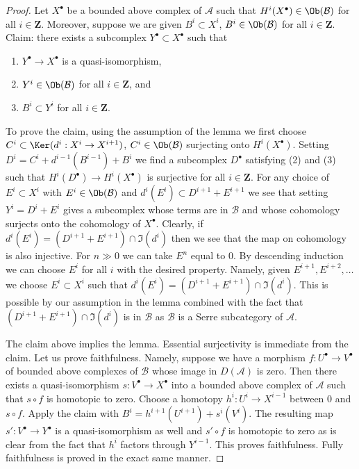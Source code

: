 \begin{proof}
Let $X^\bullet$ be a bounded above complex of $\mathcal{A}$ such that
$H^i(X^\bullet) \in \Ob(\mathcal{B})$ for all $i \in \mathbf{Z}$.
Moreover, suppose we are given $B^i \subset X^i$, $B^i \in \Ob(\mathcal{B})$
for all $i \in \mathbf{Z}$. Claim: there exists a subcomplex
$Y^\bullet \subset X^\bullet$ such that
\begin{enumerate}
\item $Y^\bullet \to X^\bullet$ is a quasi-isomorphism,
\item $Y^i \in \Ob(\mathcal{B})$ for all $i \in \mathbf{Z}$, and
\item $B^i \subset Y^i$ for all $i \in \mathbf{Z}$.
\end{enumerate}
To prove the claim, using the assumption of the lemma we first choose
$C^i \subset \Ker(d^i : X^i \to X^{i + 1})$, $C^i \in \Ob(\mathcal{B})$
surjecting onto $H^i(X^\bullet)$. Setting
$D^i = C^i + d^{i - 1}(B^{i - 1}) + B^i$ we find a subcomplex
$D^\bullet$ satisfying (2) and (3) such that
$H^i(D^\bullet) \to H^i(X^\bullet)$ is surjective for all $i \in \mathbf{Z}$.
For any choice of $E^i \subset X^i$ with $E^i \in \Ob(\mathcal{B})$ and
$d^i(E^i) \subset D^{i + 1} + E^{i + 1}$ we see that setting
$Y^i = D^i + E^i$ gives a subcomplex whose terms are in $\mathcal{B}$ and
whose cohomology surjects onto the cohomology of $X^\bullet$. Clearly, if
$d^i(E^i) = (D^{i + 1} + E^{i + 1}) \cap \Im(d^i)$ then we see that
the map on cohomology is also injective. For $n \gg 0$ we can
take $E^n$ equal to $0$. By descending induction
we can choose $E^i$ for all $i$ with the desired property.
Namely, given $E^{i + 1}, E^{i + 2}, \ldots$ we choose $E^i \subset X^i$
such that $d^i(E^i) = (D^{i + 1} + E^{i + 1}) \cap \Im(d^i)$.
This is possible by our assumption in the lemma combined with
the fact that $(D^{i + 1} + E^{i + 1}) \cap \Im(d^i)$ is
in $\mathcal{B}$ as $\mathcal{B}$ is a Serre subcategory of $\mathcal{A}$.

\medskip\noindent
The claim above implies the lemma. Essential surjectivity is immediate
from the claim. Let us prove faithfulness. Namely, suppose we have
a morphism $f : U^\bullet \to V^\bullet$ of bounded above complexes
of $\mathcal{B}$ whose image in $D(\mathcal{A})$ is zero. Then
there exists a quasi-isomorphism $s : V^\bullet \to X^\bullet$
into a bounded above complex of $\mathcal{A}$ such that
$s \circ f$ is homotopic to zero. Choose a homotopy
$h^i : U^i \to X^{i - 1}$ between $0$ and $s \circ f$.
Apply the claim with $B^i = h^{i + 1}(U^{i + 1}) + s^i(V^i)$.
The resulting map $s' : V^\bullet \to Y^\bullet$
is a quasi-isomorphism as well and $s' \circ f$ is homotopic
to zero as is clear from the fact that $h^i$ factors through $Y^{i - 1}$.
This proves faithfulness. Fully faithfulness is proved in the
exact same manner.
\end{proof}






